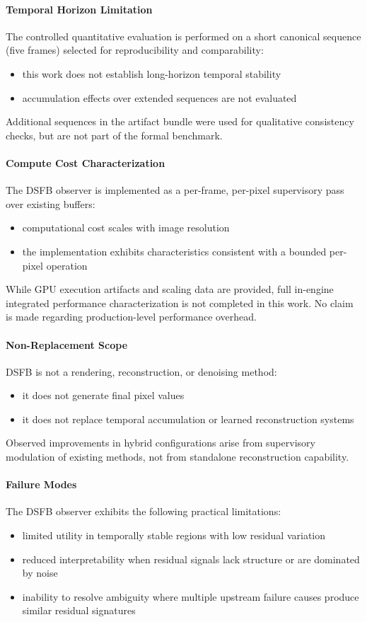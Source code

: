 \documentclass[11pt,letterpaper]{article}
\theoremstyle{gcresult}
\theoremstyle{definition}
\begin{document}
\paragraph{Temporal Horizon Limitation}
The controlled quantitative evaluation is performed on a short canonical sequence (five frames) selected for reproducibility and comparability:
\begin{itemize}
    \item this work does not establish long-horizon temporal stability
    \item accumulation effects over extended sequences are not evaluated
\end{itemize}
Additional sequences in the artifact bundle were used for qualitative consistency checks, but are not part of the formal benchmark.

\paragraph{Compute Cost Characterization}
The DSFB observer is implemented as a per-frame, per-pixel supervisory pass over existing buffers:
\begin{itemize}
    \item computational cost scales with image resolution
    \item the implementation exhibits characteristics consistent with a bounded per-pixel operation
\end{itemize}
While GPU execution artifacts and scaling data are provided, full in-engine integrated performance characterization is not completed in this work. No claim is made regarding production-level performance overhead.

\paragraph{Non-Replacement Scope}
DSFB is not a rendering, reconstruction, or denoising method:
\begin{itemize}
    \item it does not generate final pixel values
    \item it does not replace temporal accumulation or learned reconstruction systems
\end{itemize}
Observed improvements in hybrid configurations arise from supervisory modulation of existing methods, not from standalone reconstruction capability.

\paragraph{Failure Modes}
The DSFB observer exhibits the following practical limitations:
\begin{itemize}
    \item limited utility in temporally stable regions with low residual variation
    \item reduced interpretability when residual signals lack structure or are dominated by noise
    \item inability to resolve ambiguity where multiple upstream failure causes produce similar residual signatures
\end{itemize}
\end{document}
